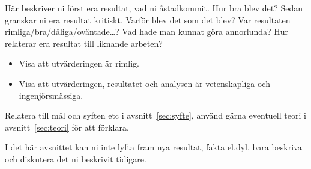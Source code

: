 Här beskriver ni först era resultat, vad ni åstadkommit.  Hur bra blev det?
Sedan granskar ni era resultat kritiskt.  Varför blev det som det blev?  Var resultaten rimliga/bra/dåliga/o\-vän\-ta\-de\ldots?  
Vad hade man kunnat göra annorlunda?  Hur relaterar era resultat till liknande arbeten?  

\begin{itemize}
\item Visa att utvärderingen är rimlig.
\item Visa att utvärderingen, resultatet och analysen är vetenskapliga och in\-gen\-jörs\-mässiga.
\end{itemize}

Relatera till mål och syften etc i avsnitt~\ref{sec:syfte}, använd gärna eventuell teori i avsnitt~\ref{sec:teori} för att förklara.

I det här avsnittet kan ni inte lyfta fram nya resultat, fakta el.dyl, bara beskriva och diskutera det ni beskrivit tidigare.

